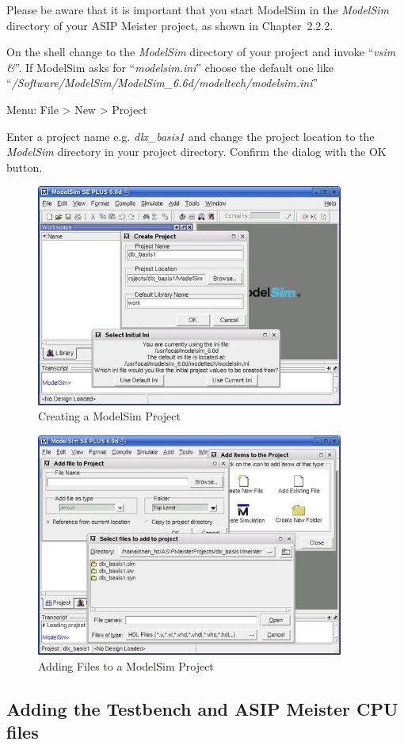 Please be aware that it is important that you start ModelSim in the
\emph{ModelSim} directory of your ASIP Meister project, as shown in
Chapter~2.2.2.

On the shell change to the \emph{ModelSim} directory of your project and
invoke ``\emph{vsim \&}''. If ModelSim asks for ``\emph{modelsim.ini}''
choose the default one like
``\emph{/Software/ModelSim/ModelSim\_6.6d/modeltech/modelsim.ini}''

Menu: File \textgreater{} New \textgreater{} Project

Enter a project name e.g. \emph{dlx\_basis1} and change the project
location to the \emph{ModelSim} directory in your project directory.
Confirm the dialog with the OK button.
\begin{figure}[!htb]
	\centering
	\includegraphics[width=0.9\textwidth]{src/images/5-1.png}
	\caption{Creating a ModelSim Project}
	\label{fig:fig51}
\end{figure}
\begin{figure}[!htb]
	\centering
	\includegraphics[width=0.9\textwidth]{src/images/5-2.png}
	\caption{Adding Files to a ModelSim Project}
	\label{fig:fig52}
\end{figure}
\hypertarget{adding-the-testbench-and-asip-meister-cpu-files}{%
\subsection{Adding the Testbench and ASIP Meister CPU
files}\label{adding-the-testbench-and-asip-meister-cpu-files}}

